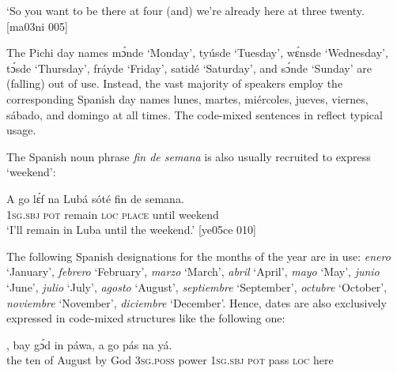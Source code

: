 \glt ‘So you want to be there at four (and) we’re already here
at three twenty. [ma03ni 005]
\z

The Pichi day names mɔ́nde ‘Monday’, tyúsde ‘Tuesday’, wɛ́nsde ‘Wednesday’, tɔ́sde ‘Thursday’, fráyde ‘Friday’, satidé ‘Saturday’, and sɔ́nde ‘Sunday’ are (falling) out of use. Instead, the vast majority of speakers employ the corresponding Spanish day names lunes, martes, miércoles, jueves, viernes, sábado, and domingo at all times. The code-mixed sentences in  reflect typical usage. 


\ea%
    \label{ex:key:1002}
\z\z

The Spanish noun phrase \textit{fin de semana} is also usually recruited to express ‘weekend’:


\ea%
    \label{ex:key:1003}
    \gll A    go  lɛ́f    na  Lubá  sóté    fin de semana.\\
\textsc{1sg.sbj}  \textsc{pot}  remain  \textsc{loc}  \textsc{place}  until  weekend\\

\glt ‘I’ll remain in Luba until the weekend.’ [ye05ce 010]
\z

The following Spanish designations for the months of the year are in use: \textit{enero} ‘January’, \textit{febrero} ‘February’, \textit{marzo} ‘March’, \textit{abril} ‘April’, \textit{mayo} ‘May’, \textit{junio} ‘June’, \textit{julio} ‘July’, \textit{agosto} ‘August’, \textit{septiembre} ‘September’, \textit{octubre} ‘October’, \textit{noviembre} ‘November’, \textit{diciembre} ‘December’. Hence, dates are also exclusively expressed in code-mixed structures like the following one: 


\ea%
    \label{ex:key:1004}
    \gll {}      ,  bay  gɔ́d  in    páwa,  a    go  pás  na  yá.\\
the  ten  of  August  by  God  \textsc{3sg.poss}  power  \textsc{1sg.sbj}  \textsc{pot}  pass  \textsc{loc}  here\\

